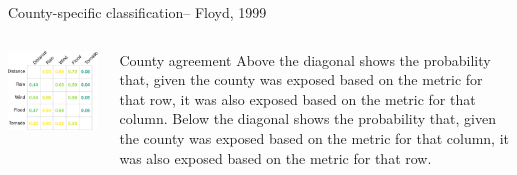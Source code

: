 \documentclass[ignorenonframetext,]{beamer}
\begin{document}
\begin{frame}{County-specific classification-- Floyd, 1999}

\begin{columns}
\begin{column}{0.6\textwidth}

\includegraphics[width=\textwidth]{anderson_jan11_files/figure-beamer/unnamed-chunk-20-1} 
\end{column}
\begin{column}{0.4\textwidth}
\small
\begin{block}{County agreement}
Above the diagonal shows the probability that, given the county was exposed based on the metric for that row, it was also exposed based on the metric for that column. Below the diagonal shows the probability that, given the county was exposed based on the metric for that column, it was also exposed based on the metric for that row.
\end{block}
\end{column}
\end{columns}

\end{frame}
\end{document}
